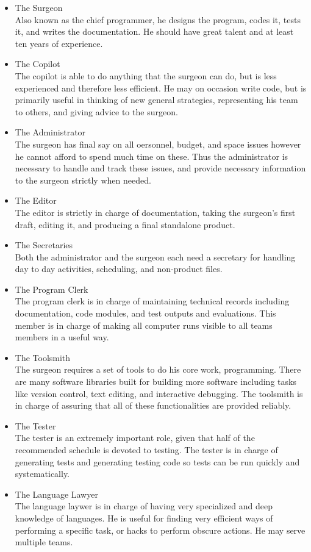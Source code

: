 \begin{itemize}
\item[] The Surgeon\\
Also known as the chief programmer, he designs the program, codes it, tests it, and writes the documentation.  He should have great talent and at least ten years of experience.
\item[] The Copilot\\
The copilot is able to do anything that the surgeon can do, but is less experienced and therefore less efficient.  He may on occasion write code, but is primarily useful in thinking of new general strategies, representing his team to others, and giving advice to the surgeon.
\item[] The Administrator\\
The surgeon has final say on all oersonnel, budget, and space issues however he cannot afford to spend much time on these.  Thus the administrator is necessary to handle and track these issues, and provide necessary information to the surgeon strictly when needed.  
\item[] The Editor\\
The editor is strictly in charge of documentation, taking the surgeon's first draft, editing it, and producing a final standalone product.
\item[] The Secretaries\\
Both the administrator and the surgeon each need a secretary for handling day to day activities, scheduling, and non-product files.
\item[] The Program Clerk\\
The program clerk is in charge of maintaining technical records including documentation, code modules, and test outputs and evaluations.  This member is in charge of making all computer runs visible to all teams members in a useful way.
\item[] The Toolsmith\\
The surgeon requires a set of tools to do his core work, programming.  There are many software libraries built for building more software including tasks like version control, text editing, and interactive debugging.  The toolsmith is in charge of assuring that all of these functionalities are provided reliably.
\item[] The Tester\\
The tester is an extremely important role, given that half of the recommended schedule is devoted to testing.  The tester is in charge of generating tests and generating testing code so tests can be run quickly and systematically.
\item[] The Language Lawyer\\
The language laywer is in charge of having very specialized and deep knowledge of languages.  He is useful for finding very efficient ways of performing a specific task, or hacks to perform obscure actions.  He may serve multiple teams.
\end{itemize}
